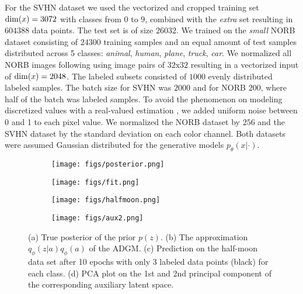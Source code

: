 \documentclass{article}
\begin{document}
For the SVHN dataset we used the vectorized and cropped training set ${\rm dim}(x)=3072$ with classes from $0$ to $9$, combined with the \textit{extra} set resulting in $604388$ data points. The test set is of size $26032$. We trained on the \textit{small} NORB dataset consisting of $24300$ training samples and an equal amount of test samples distributed across 5 classes: \textit{animal}, \textit{human}, \textit{plane}, \textit{truck}, \textit{car}. We normalized all NORB images following \citet{Miyato15} using image pairs of $32\text{x}32$ resulting in a vectorized input of ${\rm dim}(x)=2048$. The labeled subsets consisted of $1000$ evenly distributed labeled samples. The batch size for SVHN was $2000$ and for NORB $200$, where half of the batch was labeled samples. To avoid the phenomenon on modeling discretized values with a real-valued estimation \citep{Uria2013}, we added uniform noise between 0 and 1 to each pixel value. We normalized the NORB dataset by $256$ and the SVHN dataset by the standard deviation on each color channel. Both datasets were assumed Gaussian distributed for the generative models $p_\theta(x|\cdot)$.

\begin{figure*}
\centering
	\begin{subfigure}{.22\textwidth}
	  \centering
      \vspace{5mm}
      \texttt{[image: figs/posterior.png]}
      \vspace{8mm}
      \caption{ }
      \label{fig:posterior}
	\end{subfigure}
    \begin{subfigure}{.22\textwidth}
	  \centering
      \vspace{5mm}
      \texttt{[image: figs/fit.png]}
      \vspace{8mm}
      \caption{ }
      \label{fig:fit}
	\end{subfigure}
    \begin{subfigure}{.22\textwidth}
	  \centering
      \texttt{[image: figs/halfmoon.png]}
      \vspace{-5mm}
      \caption{ }
	  \label{fig:halfmoon}
	\end{subfigure}
    \begin{subfigure}{.22\textwidth}
	  \centering
      \texttt{[image: figs/aux2.png]}
	  \caption{ }
      \label{fig:aux}      
	\end{subfigure}
    \vspace{-3mm}
	\caption{(a) True posterior of the prior $p(z)$. (b) The approximation $q_\phi(z|a)q_\phi(a)$ of the ADGM. (c) Prediction on the half-moon data set after 10 epochs with only 3 labeled data points (black) for each class. (d) PCA plot on the 1st and 2nd principal component of the corresponding auxiliary latent space.}
\vspace{-2mm}
\end{figure*}
\end{document}
